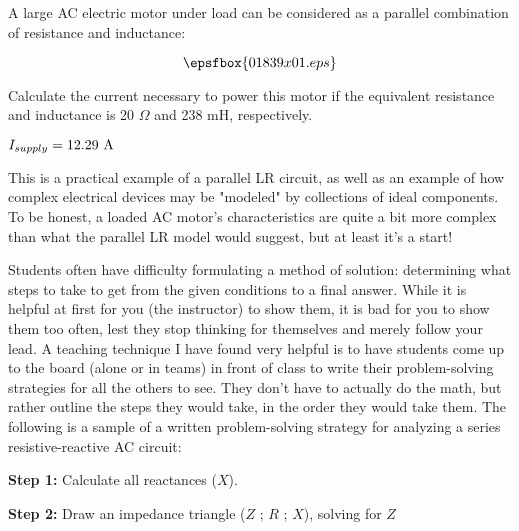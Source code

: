 

A large AC electric motor under load can be considered as a parallel combination of resistance and inductance:

$$\epsfbox{01839x01.eps}$$

Calculate the current necessary to power this motor if the equivalent resistance and inductance is 20 $\Omega$ and 238 mH, respectively.







$I_{supply} = 12.29 \hbox{ A}$







This is a practical example of a parallel LR circuit, as well as an example of how complex electrical devices may be "modeled" by collections of ideal components.  To be honest, a loaded AC motor's characteristics are quite a bit more complex than what the parallel LR model would suggest, but at least it's a start!

\vskip 10pt

Students often have difficulty formulating a method of solution: determining what steps to take to get from the given conditions to a final answer.  While it is helpful at first for you (the instructor) to show them, it is bad for you to show them too often, lest they stop thinking for themselves and merely follow your lead.  A teaching technique I have found very helpful is to have students come up to the board (alone or in teams) in front of class to write their problem-solving strategies for all the others to see.  They don't have to actually do the math, but rather outline the steps they would take, in the order they would take them.  The following is a sample of a written problem-solving strategy for analyzing a series resistive-reactive AC circuit:

\vskip 10pt

\goodbreak

{\bf Step 1:} Calculate all reactances ($X$).

{\bf Step 2:} Draw an impedance triangle ($Z$ ; $R$ ; $X$), solving for $Z$


